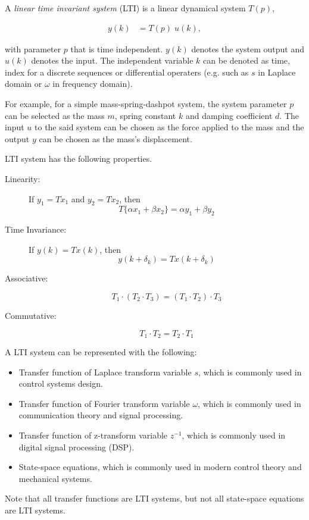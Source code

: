 \documentclass[12pt]{article}
\begin{document}
A \emph{linear time invariant  system} (LTI) is a linear dynamical system $T(p)$,

\begin{align*}
  y(k) &= T(p) \; u(k),
\end{align*}

with parameter $p$ that is time independent.  $y(k)$ denotes the
system output and $u(k)$ denotes the input.  The independent variable
$k$ can be denoted as time, index for a discrete sequences or
differential operaters (e.g. such as $s$ in Laplace domain or $\omega$
in frequency domain).

For example, for a simple mass-spring-dashpot system, the system
parameter $p$ can be selected as the mass $m$, spring constant $k$ and
damping coefficient $d$.  The input $u$ to the said system can be chosen
as the force applied to the mass and the output $y$ can be chosen as the
mass's displacement.

LTI system has the following properties.

\begin{description}
  \item[Linearity:]
    If $y_1 = T x_1$ and $y_2 = T x_2$, then 
    $$T \{\alpha x_1 + \beta x_2 \} = \alpha y_1 + \beta y_2 $$ 
  \item[Time Invariance:]
    If $y(k) = T x(k)$, then
    $$ y(k+\delta_k) = T x(k + \delta_k) $$
  \item[Associative:]
    $$ T_1 \cdot ( T_2 \cdot T_3 ) = (T_1 \cdot T_2) \cdot T_3 $$
  \item[Commutative:]
    $$ T_1 \cdot T_2 = T_2 \cdot T_1 $$
\end{description}

A LTI system can be represented with the following:

\begin{itemize}
  \item Transfer function of Laplace transform variable $s$, which is commonly
    used in control systems design.
  \item Transfer function of Fourier transform variable $\omega$, which is
    commonly used in communication theory and signal processing.
  \item Transfer function of z-transform variable $z^{-1}$, which is
    commonly used in digital signal processing (DSP).
  \item State-space equations, which is commonly used in modern control
    theory and mechanical systems.
\end{itemize}

Note that all transfer functions are LTI systems, but not all
state-space equations are LTI systems.
\end{document}

